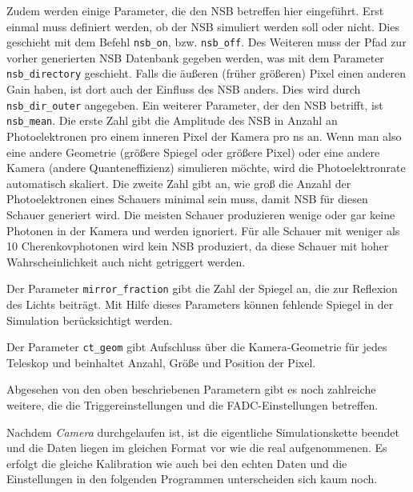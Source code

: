 Zudem werden einige Parameter, die den NSB betreffen hier eingeführt.
Erst einmal muss definiert werden, ob der NSB simuliert werden soll oder nicht. 
Dies geschieht mit dem Befehl \texttt{nsb\_on}, bzw. \texttt{nsb\_off}.
Des Weiteren muss der Pfad zur vorher generierten NSB Datenbank gegeben werden, was mit dem Parameter \texttt{nsb\_directory} geschieht.
Falls die äußeren (früher größeren) Pixel einen anderen Gain haben, ist dort auch der Einfluss des NSB anders. 
Dies wird durch \texttt{nsb\_dir\_outer} angegeben.
Ein weiterer Parameter, der den NSB betrifft, ist \texttt{nsb\_mean}.
Die erste Zahl gibt die Amplitude des NSB in Anzahl an Photoelektronen pro einem inneren Pixel der Kamera pro ns an.
Wenn man also eine andere Geometrie (größere Spiegel oder größere Pixel) oder eine andere Kamera (andere Quanteneffizienz) simulieren möchte, wird die Photoelektronrate automatisch skaliert.
Die zweite Zahl gibt an, wie groß die Anzahl der Photoelektronen eines Schauers minimal sein muss, damit NSB für diesen Schauer generiert wird.
Die meisten Schauer produzieren wenige oder gar keine Photonen in der Kamera und werden ignoriert.
Für alle Schauer mit weniger als 10 Cherenkovphotonen wird kein NSB produziert, da diese Schauer mit hoher Wahrscheinlichkeit auch nicht getriggert werden.

Der Parameter \texttt{mirror\_fraction} gibt die Zahl der Spiegel an, die zur Reflexion des Lichts beiträgt. 
Mit Hilfe dieses Parameters können fehlende Spiegel in der Simulation berücksichtigt werden.

Der Parameter \texttt{ct\_geom} gibt Aufschluss über die Kamera-Geometrie für jedes Teleskop und beinhaltet Anzahl, Größe und Position der Pixel.

Abgesehen von den oben beschriebenen Parametern gibt es noch zahlreiche weitere, die die Triggereinstellungen und die FADC-Einstellungen betreffen.

Nachdem \textit{Camera} durchgelaufen ist, ist die eigentliche Simulationskette beendet und die Daten liegen im gleichen Format vor wie die real aufgenommenen.
Es erfolgt die gleiche Kalibration wie auch bei den echten Daten und die Einstellungen in den folgenden Programmen unterscheiden sich kaum noch.


